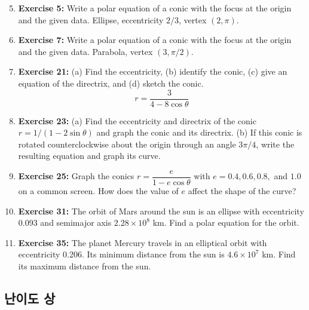 \documentclass[12pt, a4paper]{article}
\begin{document}
\begin{enumerate}
    \setcounter{enumi}{4}
    \item \textbf{Exercise 5:} Write a polar equation of a conic with the focus at the origin and the given data. Ellipse, eccentricity $2/3$, vertex $(2, \pi)$.

    \item \textbf{Exercise 7:} Write a polar equation of a conic with the focus at the origin and the given data. Parabola, vertex $(3, \pi/2)$.

    \item \textbf{Exercise 21:} (a) Find the eccentricity, (b) identify the conic, (c) give an equation of the directrix, and (d) sketch the conic.
    \[ r = \frac{3}{4 - 8\cos\theta} \]

    \item \textbf{Exercise 23:} (a) Find the eccentricity and directrix of the conic $r = 1/(1 - 2\sin\theta)$ and graph the conic and its directrix. (b) If this conic is rotated counterclockwise about the origin through an angle $3\pi/4$, write the resulting equation and graph its curve.

    \item \textbf{Exercise 25:} Graph the conics $r = \dfrac{e}{1 - e\cos\theta}$ with $e = 0.4, 0.6, 0.8,$ and $1.0$ on a common screen. How does the value of $e$ affect the shape of the curve?

    \item \textbf{Exercise 31:} The orbit of Mars around the sun is an ellipse with eccentricity 0.093 and semimajor axis $2.28 \times 10^8$ km. Find a polar equation for the orbit.

    \item \textbf{Exercise 35:} The planet Mercury travels in an elliptical orbit with eccentricity 0.206. Its minimum distance from the sun is $4.6 \times 10^7$ km. Find its maximum distance from the sun.
\end{enumerate}

\hrulefill
\vspace{1em}

\subsection*{난이도 상}
\end{document}
